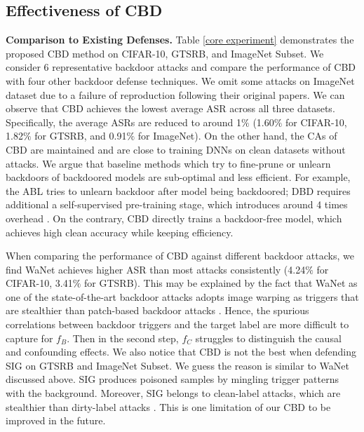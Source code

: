\subsection{Effectiveness of CBD}
\noindent\textbf{Comparison to Existing Defenses.} Table \ref{core experiment} demonstrates the proposed CBD method on CIFAR-10,
GTSRB, and ImageNet Subset. We consider 6 representative backdoor attacks and compare the performance of CBD with four other backdoor defense techniques. We omit some attacks on ImageNet dataset due to a failure of reproduction following their original papers.
We can observe that CBD achieves the lowest average ASR across all three datasets. Specifically, the average ASRs are reduced to around 1$\%$ (1.60$\%$ for CIFAR-10, 1.82$\%$ for GTSRB, and 0.91$\%$ for ImageNet). 
On the other hand, the CAs of CBD are maintained and are close to training DNNs on clean datasets without attacks.
We argue that baseline methods which try to fine-prune or unlearn backdoors of backdoored models are sub-optimal and less efficient. For example, the ABL tries to unlearn backdoor after model being backdoored; DBD requires additional a self-supervised pre-training stage, which introduces around 4 times overhead \cite{backdoordecouple}. On the contrary, CBD directly trains a backdoor-free model, which achieves high clean accuracy while keeping efficiency. \label{effectiveness}

When comparing the performance of CBD against different backdoor attacks, we find WaNet achieves higher ASR than most attacks consistently (4.24$\%$ for CIFAR-10, 3.41$\%$ for GTSRB). This may be explained by the fact that WaNet  as one of the state-of-the-art backdoor attacks adopts image warping as triggers that are stealthier than patch-based backdoor attacks \cite{nguyen2021wanet}. Hence, the spurious correlations between backdoor triggers and the target label are more difficult to capture for $f_B$. Then in the second step, $f_C$ struggles to distinguish the causal and confounding effects. We also notice that CBD is not the best when defending SIG on GTSRB and ImageNet Subset. We guess the reason is similar to WaNet discussed above. SIG produces poisoned samples by mingling trigger patterns with the background. Moreover, SIG belongs to clean-label attacks, which are stealthier than dirty-label attacks \cite{barni2019new}. This is one limitation of our CBD to be improved in the future.

